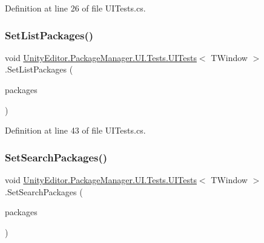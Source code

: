 Definition at line 26 of file U\+I\+Tests.\+cs.

\mbox{\label{class_unity_editor_1_1_package_manager_1_1_u_i_1_1_tests_1_1_u_i_tests_abd2ad07e23f3aab12e2514f2121cd80e}} 
\subsubsection{\texorpdfstring{SetListPackages()}{SetListPackages()}}
{\footnotesize\ttfamily void \mbox{\hyperlink{class_unity_editor_1_1_package_manager_1_1_u_i_1_1_tests_1_1_u_i_tests}{Unity\+Editor.\+Package\+Manager.\+U\+I.\+Tests.\+U\+I\+Tests}}$<$ T\+Window $>$.Set\+List\+Packages (\begin{DoxyParamCaption}\item[{I\+Enumerable$<$ \mbox{\hyperlink{class_unity_editor_1_1_package_manager_1_1_u_i_1_1_package_info}{Package\+Info}} $>$}]{packages }\end{DoxyParamCaption})\hspace{0.3cm}{\ttfamily [protected]}}



Definition at line 43 of file U\+I\+Tests.\+cs.

\mbox{\label{class_unity_editor_1_1_package_manager_1_1_u_i_1_1_tests_1_1_u_i_tests_a273a4933fc6cb214a847491c20e37a6c}} 
\subsubsection{\texorpdfstring{SetSearchPackages()}{SetSearchPackages()}}
{\footnotesize\ttfamily void \mbox{\hyperlink{class_unity_editor_1_1_package_manager_1_1_u_i_1_1_tests_1_1_u_i_tests}{Unity\+Editor.\+Package\+Manager.\+U\+I.\+Tests.\+U\+I\+Tests}}$<$ T\+Window $>$.Set\+Search\+Packages (\begin{DoxyParamCaption}\item[{I\+Enumerable$<$ \mbox{\hyperlink{class_unity_editor_1_1_package_manager_1_1_u_i_1_1_package_info}{Package\+Info}} $>$}]{packages }\end{DoxyParamCaption})\hspace{0.3cm}{\ttfamily [protected]}}



